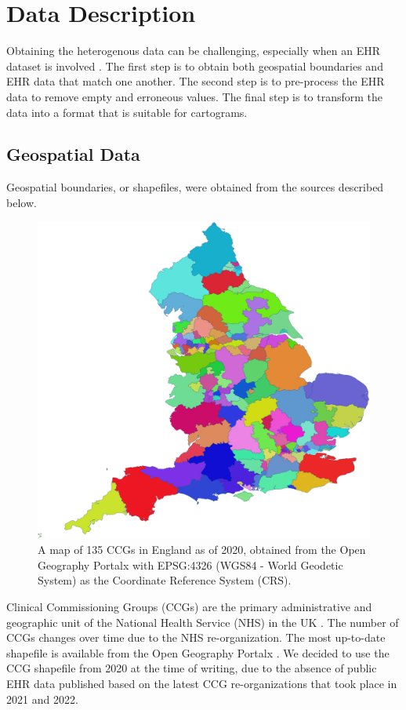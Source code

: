 \section{Data Description}

Obtaining the heterogenous data can be challenging, especially when an EHR dataset is involved \cite{wang2021EHRa}. The first step is to obtain both geospatial boundaries and EHR data that match one another. The second step is to pre-process the EHR data to remove empty and erroneous values. The final step is to transform the data into a format that is suitable for cartograms.

\subsection{Geospatial Data}

Geospatial boundaries, or shapefiles, were obtained from the sources described below.
{
\begin{figure}[tb!]
    \centering
    \includegraphics[width=0.6\columnwidth]{figure/ccg.png}
    \caption{A map of 135 CCGs in England as of 2020, obtained from the Open Geography Portalx \cite{opengeographyportalxOpen} with EPSG:4326 (WGS84 - World Geodetic System) as the Coordinate Reference System (CRS).}
    \label{fig:ccg}
\end{figure}
}

 Clinical Commissioning Groups (CCGs) are the primary administrative and geographic unit of the National Health Service (NHS) in the UK \cite{nhsNHS}. The number of CCGs changes over time due to the NHS re-organization. The most up-to-date shapefile is available from the Open Geography Portalx \cite{opengeographyportalxOpen}. We decided to use the CCG shapefile from 2020 at the time of writing, due to the absence of public EHR data published based on the latest CCG re-organizations that took place in 2021 and 2022.

